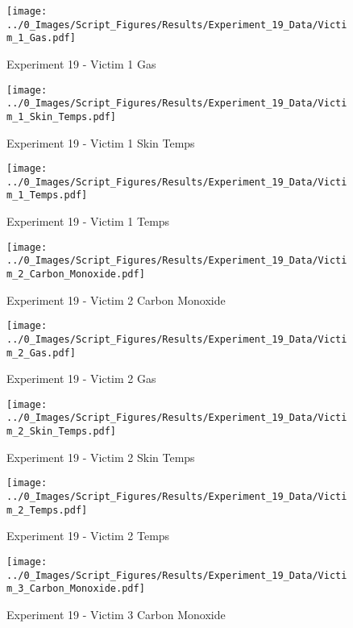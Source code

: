 	\clearpage

	\begin{figure}[H]
		\centering
		\texttt{[image: ../0\_Images/Script\_Figures/Results/Experiment\_19\_Data/Victim\_1\_Gas.pdf]}
		\caption[]{Experiment 19 - Victim 1 Gas}
	\end{figure}
 

	\begin{figure}[H]
		\centering
		\texttt{[image: ../0\_Images/Script\_Figures/Results/Experiment\_19\_Data/Victim\_1\_Skin\_Temps.pdf]}
		\caption[]{Experiment 19 - Victim 1 Skin Temps}
	\end{figure}
 
	\clearpage

	\begin{figure}[H]
		\centering
		\texttt{[image: ../0\_Images/Script\_Figures/Results/Experiment\_19\_Data/Victim\_1\_Temps.pdf]}
		\caption[]{Experiment 19 - Victim 1 Temps}
	\end{figure}
 

	\begin{figure}[H]
		\centering
		\texttt{[image: ../0\_Images/Script\_Figures/Results/Experiment\_19\_Data/Victim\_2\_Carbon\_Monoxide.pdf]}
		\caption[]{Experiment 19 - Victim 2 Carbon Monoxide}
	\end{figure}
 
	\clearpage

	\begin{figure}[H]
		\centering
		\texttt{[image: ../0\_Images/Script\_Figures/Results/Experiment\_19\_Data/Victim\_2\_Gas.pdf]}
		\caption[]{Experiment 19 - Victim 2 Gas}
	\end{figure}
 

	\begin{figure}[H]
		\centering
		\texttt{[image: ../0\_Images/Script\_Figures/Results/Experiment\_19\_Data/Victim\_2\_Skin\_Temps.pdf]}
		\caption[]{Experiment 19 - Victim 2 Skin Temps}
	\end{figure}
 
	\clearpage

	\begin{figure}[H]
		\centering
		\texttt{[image: ../0\_Images/Script\_Figures/Results/Experiment\_19\_Data/Victim\_2\_Temps.pdf]}
		\caption[]{Experiment 19 - Victim 2 Temps}
	\end{figure}
 

	\begin{figure}[H]
		\centering
		\texttt{[image: ../0\_Images/Script\_Figures/Results/Experiment\_19\_Data/Victim\_3\_Carbon\_Monoxide.pdf]}
		\caption[]{Experiment 19 - Victim 3 Carbon Monoxide}
	\end{figure}
 
